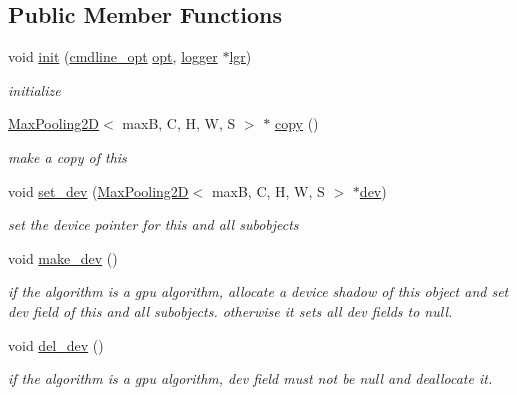 \subsection*{Public Member Functions}
\begin{DoxyCompactItemize}
\item 
void \hyperlink{structMaxPooling2D_a004da9768f6934b82ce6758ab7da92be}{init} (\hyperlink{structcmdline__opt}{cmdline\+\_\+opt} \hyperlink{structMaxPooling2D_a573bf3df3ae3d9043763c6743f1b87f9}{opt}, \hyperlink{structlogger}{logger} $\ast$\hyperlink{structMaxPooling2D_a516ea469a544d99543c9073bc318f970}{lgr})
\begin{DoxyCompactList}\small\item\em initialize \end{DoxyCompactList}\item 
\hyperlink{structMaxPooling2D}{Max\+Pooling2D}$<$ maxB, C, H, W, S $>$ $\ast$ \hyperlink{structMaxPooling2D_a84452150daaa577f3a13d13e429d1eca}{copy} ()
\begin{DoxyCompactList}\small\item\em make a copy of this \end{DoxyCompactList}\item 
void \hyperlink{structMaxPooling2D_ab534c745a6fbfac5a8bd1718a1510dbe}{set\+\_\+dev} (\hyperlink{structMaxPooling2D}{Max\+Pooling2D}$<$ maxB, C, H, W, S $>$ $\ast$\hyperlink{structMaxPooling2D_ad21014604fa6abddbfdcdc0b64f37196}{dev})
\begin{DoxyCompactList}\small\item\em set the device pointer for this and all subobjects \end{DoxyCompactList}\item 
void \hyperlink{structMaxPooling2D_a2cb8392bfcf78dc55e7157ef3095364e}{make\+\_\+dev} ()
\begin{DoxyCompactList}\small\item\em if the algorithm is a gpu algorithm, allocate a device shadow of this object and set dev field of this and all subobjects. otherwise it sets all dev fields to null. \end{DoxyCompactList}\item 
void \hyperlink{structMaxPooling2D_a5d3cd9d8a476ae96cb7f86b5a0409f72}{del\+\_\+dev} ()
\begin{DoxyCompactList}\small\item\em if the algorithm is a gpu algorithm, dev field must not be null and deallocate it. \end{DoxyCompactList}\item 

\end{DoxyCompactItemize}
